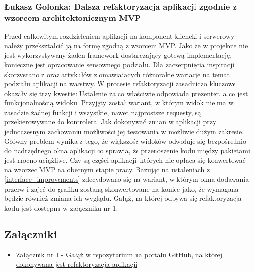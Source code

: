 \documentclass[12pt,a4paper,oneside]{article}
\theoremstyle{definition}
\numberwithin{equation}{section}
\begin{document}
\subsubsection{Łukasz Golonka: Dalsza refaktoryzacja aplikacji zgodnie z wzorcem architektonicznym MVP}
Przed całkowitym rozdzieleniem aplikacji na komponent kliencki i serwerowy należy przekształcić ją na formę zgodną z wzorcem MVP.
Jako że w projekcie nie jest wykorzystywany żaden framework dostarczający gotową implementację, konieczne jest opracowanie sensownego podziału.
Dla zaczerpnięcia inspiracji skorzystano z \cite{mvp_ref} oraz artykułów z \cite{layers_design} omawiających różnorakie wariacje na temat podziału aplikacji na warstwy.
W procesie refaktoryzacji zasadniczo kluczowe okazały się trzy kwestie:
Ustalenie za co właściwie odpowiada prezenter, a co jest funkcjonalnością widoku.
Przyjęty został wariant, w którym widok nie  ma w zasadzie żadnej funkcji i wszystkie, nawet najprostsze requesty, są przekierowywane do kontrolera.
Jak dokonywać zmian w aplikacji przy jednoczesnym zachowaniu możliwości jej testowania w możliwie dużym zakresie. Główny problem wynika z tego, że większość widoków odwołuje się bezpośrednio do nadrzędnego okna aplikacji co sprawia, że przenoszenie kodu między pakietami jest mocno uciążliwe.
Czy są części aplikacji, których nie opłaca się konwertować na wzorzec MVP na obecnym etapie pracy. Bazując na ustaleniach z \ref{interface_improvements} zdecydowano się na wariant, w którym okna dodawania przerw i zajęć do grafiku zostaną skonwertowane na koniec jako, że wymagana będzie również zmiana ich wyglądu.
Gałąź, na której odbywa się refaktoryzacja kodu jest dostępna w załączniku nr 1.


\subsection{Załączniki}
\begin{itemize}
	\item Załącznik nr 1 - \href{https://github.com/lukaszgo1/engineering_project_2022/tree/mvp}{Gałąź w repozytorium na portalu GitHub, na której dokonywana jest refaktoryzacja aplikacji}
\end{itemize}


\renewcommand\refname{Literatura (jeżeli wymagana)}

%
%
%
\end{document}
